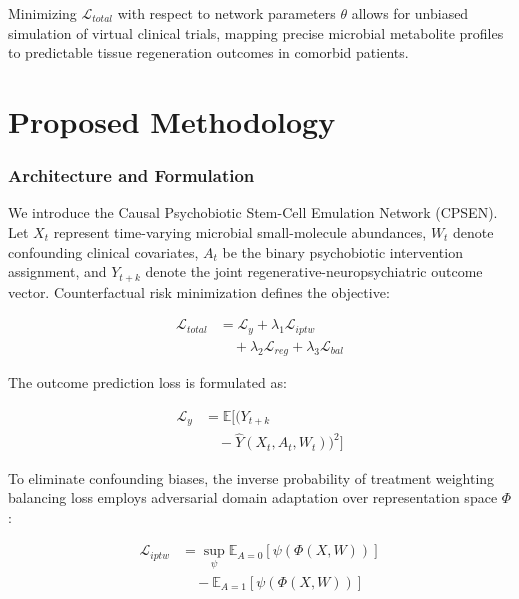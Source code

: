 \documentclass[10pt,twocolumn]{article}
\begin{document}
Minimizing $\mathcal{L}_{total}$ with respect to network parameters $\theta$ allows for unbiased simulation of virtual clinical trials, mapping precise microbial metabolite profiles to predictable tissue regeneration outcomes in comorbid patients.

\section{Proposed Methodology}
\subsubsection{Architecture and Formulation}
We introduce the Causal Psychobiotic 
Stem-Cell Emulation Network (CPSEN).
Let $X_t$ represent time-varying 
microbial small-molecule abundances, 
$W_t$ denote confounding clinical 
covariates, $A_t$ be the binary 
psychobiotic intervention 
assignment, and $Y_{t+k}$ denote 
the joint regenerative-neuropsychiatric 
outcome vector. Counterfactual risk 
minimization defines the objective:

\begin{equation}
\begin{aligned}
\mathcal{L}_{total} &= \mathcal{L}_{y} 
+ \lambda_1 \mathcal{L}_{iptw} \\
&\quad + \lambda_2 \mathcal{L}_{reg} 
+ \lambda_3 \mathcal{L}_{bal}
\end{aligned}
\end{equation}

The outcome prediction loss 
is formulated as:

\begin{equation}
\begin{aligned}
\mathcal{L}_{y} &= \mathbb{E} \big[ 
(Y_{t+k} \\
&\quad - \hat{Y}(X_t, A_t, W_t))^2 
\big]
\end{aligned}
\end{equation}

To eliminate confounding biases, 
the inverse probability of 
treatment weighting balancing 
loss employs adversarial domain 
adaptation over representation 
space $\Phi$:

\begin{equation}
\begin{aligned}
\mathcal{L}_{iptw} &= \sup_{\psi} 
\mathbb{E}_{A=0} [\psi(\Phi(X, W))] \\
&\quad - \mathbb{E}_{A=1} 
[\psi(\Phi(X, W))]
\end{aligned}
\end{equation}
\end{document}
